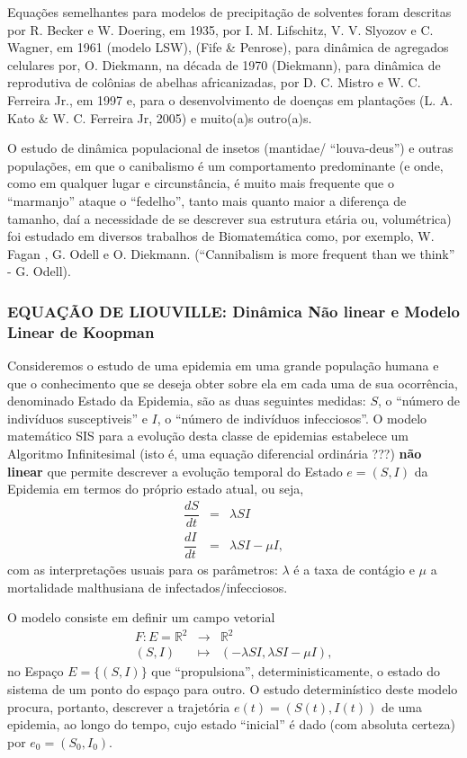 Equações semelhantes para modelos de precipitação de solventes foram descritas por R. Becker e W. Doering, em 1935, por I. M. Lifschitz, V. V. Slyozov e C. Wagner, em 1961 (modelo LSW), (Fife \& Penrose), para dinâmica de agregados celulares por, O. Diekmann, na década de 1970 (Diekmann), para dinâmica de reprodutiva de colônias de abelhas africanizadas, por D. C. Mistro e W. C. Ferreira Jr., em 1997 e, para o desenvolvimento de doenças em plantações (L. A. Kato \& W. C. Ferreira Jr, 2005) e muito(a)s outro(a)s.

O estudo de dinâmica populacional de insetos (mantidae/ ``louva-deus'') e outras populações, em que o canibalismo é um comportamento predominante (e onde, como em qualquer lugar e circunstância, é muito mais frequente que o ``marmanjo'' ataque o ``fedelho'', tanto mais quanto maior a diferença de tamanho, daí a necessidade de se descrever sua estrutura etária ou, volumétrica) foi estudado em diversos trabalhos de Biomatemática como, por exemplo, W. Fagan , G. Odell e O. Diekmann. (``Cannibalism is more frequent than we think'' - G. Odell).

\subsubsection{EQUAÇÃO DE LIOUVILLE: Dinâmica Não linear e Modelo Linear de Koopman}

Consideremos o estudo de uma epidemia em uma grande população humana e que o conhecimento que se deseja obter sobre ela em cada uma de sua ocorrência, denominado Estado da Epidemia, são as duas seguintes medidas: $S$, o ``número de indivíduos susceptiveis'' e $I$, o ``número de indivíduos infecciosos''. O modelo matemático SIS para a evolução desta classe de epidemias estabelece um Algoritmo Infinitesimal (isto é, uma equação diferencial {\red ordinária ???}) \textbf{não linear} que permite descrever a evolução temporal do Estado \(e = (S, I)\) da Epidemia em termos do próprio estado atual, ou seja,
\begin{eqnarray} %
\dfrac{dS}{dt} &=& \lambda S I \\
\dfrac{dI}{dt} &=& \lambda S I - \mu I,
\end{eqnarray}
com as interpretações usuais para os parâmetros: \(\lambda\) é a taxa de contágio e \(\mu\) a mortalidade malthusiana de infectados/infecciosos.

O modelo consiste em definir um campo vetorial
\[\begin{array}{rcl}
F: E = \mathbb{R}^2 & \to & \mathbb{R}^2 \\
(S, I) & \mapsto & (-\lambda S I, \lambda S I - \mu I),
\end{array}\]
no Espaço \(E = \{(S, I)\}\)  que ``propulsiona'', deterministicamente, o estado do sistema de um ponto do espaço para outro. O estudo determinístico deste modelo procura, portanto, descrever a trajetória \(e(t) = (S(t), I(t))\) de uma epidemia, ao longo do tempo, cujo estado ``inicial'' é dado (com absoluta certeza) por \(e_0 = (S_0, I_0)\).

